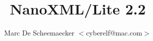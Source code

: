 \documentclass[a4paper]{book}
\title{NanoXML/Lite 2.2}
\author{Marc De Scheemaecker $<$cyberelf@mac.com$>$}
\begin{document}
\titlepage
\maketitle

\tableofcontents




\end{document}
